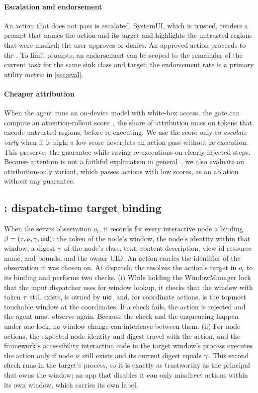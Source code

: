 \paragraph{Escalation and endorsement} An action that does not pass is escalated. SystemUI, which is trusted, renders a prompt that names the action and its target and highlights the untrusted regions that were masked; the user approves or denies. An approved action proceeds to the \DB{}. To limit prompts, an endorsement can be scoped to the remainder of the current task for the same sink class and target; the endorsement rate is a primary utility metric in \cref{sec:eval}.

\paragraph{Cheaper attribution} When the agent runs an on-device model with white-box access, the gate can compute an attention-rollout score~\cite{abnar2020attentionflow}, the share of attribution mass on tokens that encode untrusted regions, before re-executing. We use the score only to \emph{escalate early} when it is high; a low score never lets an action pass without re-execution. This preserves the guarantee while saving re-executions on clearly injected steps. Because attention is not a faithful explanation in general~\cite{jain2019attention}, we also evaluate an attribution-only variant, which passes actions with low scores, as an ablation without any guarantee.

\subsection{\DB{}: dispatch-time target binding}\label{sec:design-binder}

When the \LS{} serves observation $o_t$, it records for every interactive node a binding $\beta=(\tau,\nu,\gamma,\mathsf{uid})$: the token of the node's window, the node's identity within that window, a digest $\gamma$ of the node's class, text, content description, view-id resource name, and bounds, and the owner UID. An action carries the identifier of the observation it was chosen on. At dispatch, the \DB{} resolves the action's target in $o_t$ to its binding and performs two checks. (i) While holding the WindowManager lock that the input dispatcher uses for window lookup, it checks that the window with token $\tau$ still exists, is owned by $\mathsf{uid}$, and, for coordinate actions, is the topmost touchable window at the coordinates. If a check fails, the action is rejected and the agent must observe again. Because the check and the enqueueing happen under one lock, no window change can interleave between them. (ii) For node actions, the expected node identity and digest travel with the action, and the framework's accessibility interaction code in the target window's process executes the action only if node $\nu$ still exists and its current digest equals $\gamma$. This second check runs in the target's process, so it is exactly as trustworthy as the principal that owns the window; an app that disables it can only misdirect actions within its own window, which carries its own label.


